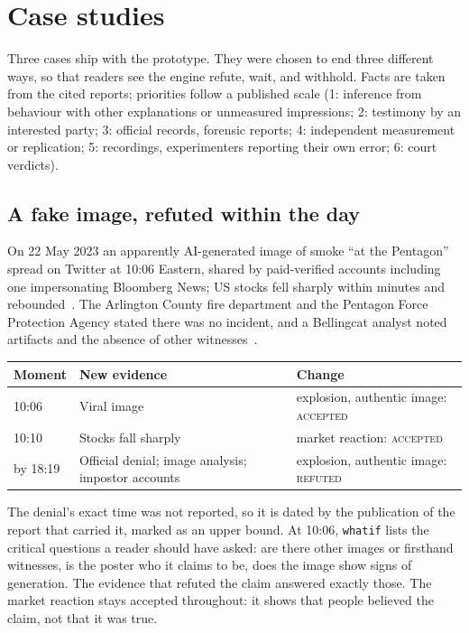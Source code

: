 \documentclass[11pt]{article}
\newcommand{\cmd}[1]{\texttt{#1}}
\begin{document}
\section{Case studies}
\label{sec:cases}

Three cases ship with the prototype. They were chosen to end three
different ways, so that readers see the engine refute, wait, and
withhold. Facts are taken from the cited reports; priorities follow a
published scale (1: inference from behaviour with other explanations or
unmeasured impressions; 2: testimony by an interested party; 3:
official records, forensic reports; 4: independent measurement or
replication; 5: recordings, experimenters reporting their own error;
6: court verdicts).

\subsection{A fake image, refuted within the day}

On 22 May 2023 an apparently AI-generated image of smoke ``at the
Pentagon'' spread on Twitter at 10:06 Eastern, shared by paid-verified
accounts including one impersonating Bloomberg News; US stocks fell
sharply within minutes and rebounded~\cite{petapixel,npr}. The Arlington
County fire department and the Pentagon Force Protection Agency stated
there was no incident, and a Bellingcat analyst noted artifacts and the
absence of other witnesses~\cite{npr}.

\begin{center}\small
\begin{tabularx}{\linewidth}{@{}l X l@{}}
\toprule
Moment & New evidence & Change\\
\midrule
10:06 & Viral image & explosion, authentic image: \textsc{accepted}\\
10:10 & Stocks fall sharply & market reaction: \textsc{accepted}\\
by 18:19 & Official denial; image analysis; impostor accounts & explosion, authentic image: \textsc{refuted}\\
\bottomrule
\end{tabularx}
\end{center}

The denial's exact time was not reported, so it is dated by the
publication of the report that carried it, marked as an upper bound. At
10:06, \cmd{whatif} lists the critical questions a reader should have
asked: are there other images or firsthand witnesses, is the poster who
it claims to be, does the image show signs of generation. The evidence
that refuted the claim answered exactly those. The market reaction stays
accepted throughout: it shows that people believed the claim, not that
it was true.
\end{document}
